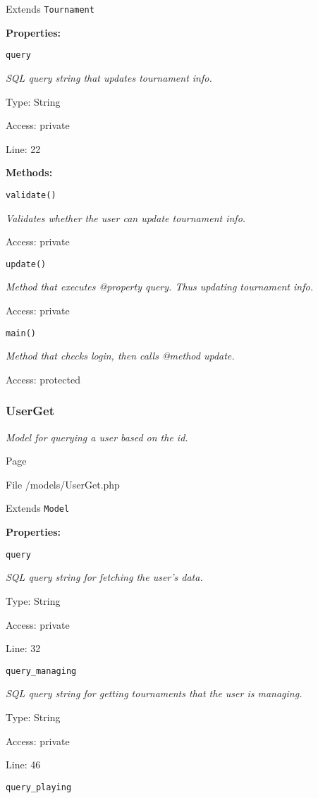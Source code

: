Extends \texttt{Tournament}

\textbf{Properties:}

\texttt{query}

{\scriptsize
\textit{SQL query string that updates tournament info.}

Type: String

Access: private

Line: 22

}
\textbf{Methods:}

\texttt{validate()}

{\scriptsize
\textit{Validates whether the user can update tournament info.}

Access: private

}

\texttt{update()}

{\scriptsize
\textit{Method that executes @property query.
Thus updating tournament info.}

Access: private

}

\texttt{main()}

{\scriptsize
\textit{Method that checks login, then calls @method update.}

Access: protected

}

\subsubsection{UserGet}
\textit{Model for querying a user based on the id.}

Page \pageref{UserGet.php}

File /models/UserGet.php

Extends \texttt{Model}

\textbf{Properties:}

\texttt{query}

{\scriptsize
\textit{SQL query string for fetching the user's data.}

Type: String

Access: private

Line: 32

}
\texttt{query\_managing}

{\scriptsize
\textit{SQL query string for getting tournaments that the user is managing.}

Type: String

Access: private

Line: 46

}
\texttt{query\_playing}

